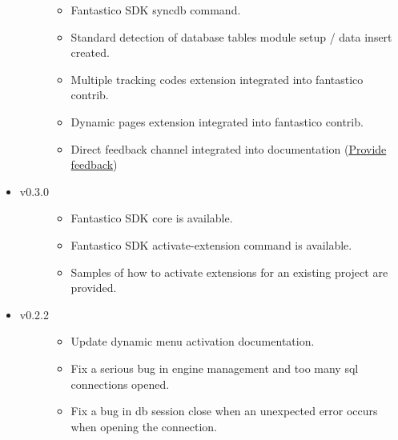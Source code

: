 \documentclass[letterpaper,10pt,english]{sphinxmanual}
\begin{document}
\begin{itemize}
\begin{description}
\begin{itemize}
\item {} 
Fantastico SDK syncdb command.

\item {} 
Standard detection of database tables module setup / data insert created.

\item {} 
Multiple tracking codes extension integrated into fantastico contrib.

\item {} 
Dynamic pages extension integrated into fantastico contrib.

\item {} 
Direct feedback channel integrated into documentation (\href{https://docs.google.com/forms/d/1tKBopU3lfDB\_w8F4h7Rl1Rn4uydAJq-nha09L\_ptJck/edit?usp=sharing}{Provide feedback})

\end{itemize}

\end{description}

\item {} \begin{description}
\item[{v0.3.0}] \leavevmode\begin{itemize}
\item {} 
Fantastico SDK core is available.

\item {} 
Fantastico SDK activate-extension command is available.

\item {} 
Samples of how to activate extensions for an existing project are provided.

\end{itemize}

\end{description}

\item {} \begin{description}
\item[{v0.2.2}] \leavevmode\begin{itemize}
\item {} 
Update dynamic menu activation documentation.

\item {} 
Fix a serious bug in engine management and too many sql connections opened.

\item {} 
Fix a bug in db session close when an unexpected error occurs when opening the connection.


\end{itemize}
\end{description}
\end{itemize}
\end{document}
